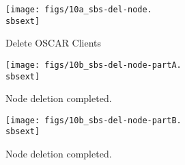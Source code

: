 \begin{figure}[htbp]
  \begin{center}
    \texttt{[image: figs/10a\_sbs-del-node.\\sbsext]}
    \caption{Delete OSCAR Clients}
    \label{fig:sbs-del-node1}
  \end{center}
\end{figure}

\begin{figure}[htbp]
  \begin{center}
    \texttt{[image: figs/10b\_sbs-del-node-partA.\\sbsext]}
    \caption{Node deletion completed.}
    \label{fig:sbs-del-node1-done-partA}
  \end{center}
\end{figure}

\begin{figure}[htbp]
  \begin{center}
    \texttt{[image: figs/10b\_sbs-del-node-partB.\\sbsext]}
    \caption{Node deletion completed.}
    \label{fig:sbs-del-node1-done-partB}
  \end{center}
\end{figure}


\clearpage

